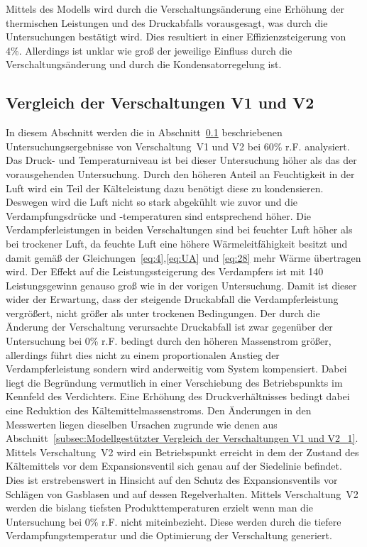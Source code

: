 Mittels des Modells wird durch die Verschaltungsänderung eine Erhöhung der thermischen Leistungen und des Druckabfalls vorausgesagt, was durch die Untersuchungen bestätigt wird. Dies resultiert in einer Effizienzsteigerung von \unit{4}{\%}. Allerdings ist unklar wie groß der jeweilige Einfluss durch die Verschaltungsänderung und durch die Kondensatorregelung ist.

\subsection{Vergleich der Verschaltungen V1 und V2}
\label{subsec:Vergleich der Verschaltungen V1 und V2_1}

In diesem Abschnitt werden die in Abschnitt~\ref{subsec:Vergleich der Verschaltungen V1 und V2_1} beschriebenen Untersuchungsergebnisse von Verschaltung~V1 und V2 bei \unit{60}{\%} r.F. analysiert.
Das Druck- und Temperaturniveau ist bei dieser Untersuchung höher als das der vorausgehenden Untersuchung. Durch den höheren Anteil an Feuchtigkeit in der Luft wird ein Teil der Kälteleistung dazu benötigt diese zu kondensieren. Deswegen wird die Luft nicht so stark abgekühlt wie zuvor und die Verdampfungsdrücke und -temperaturen sind entsprechend höher. Die Verdampferleistungen in beiden Verschaltungen sind bei feuchter Luft höher als bei trockener Luft, da feuchte Luft eine höhere Wärmeleitfähigkeit besitzt und damit gemäß der Gleichungen~\ref{eq:4},\ref{eq:UA} und \ref{eq:28} mehr Wärme übertragen wird\cite{Lasance.2003}. Der Effekt auf die Leistungssteigerung des Verdampfers ist mit \unit{140}{\watt} Leistungsgewinn genauso groß wie in der vorigen Untersuchung. Damit ist dieser wider der Erwartung, dass der steigende Druckabfall die Verdampferleistung vergrößert, nicht größer als unter trockenen Bedingungen. Der durch die Änderung der Verschaltung verursachte Druckabfall ist zwar gegenüber der Untersuchung bei \unit{0}{\%} r.F. bedingt durch den höheren Massenstrom größer, allerdings führt dies nicht zu einem proportionalen Anstieg der Verdampferleistung sondern wird anderweitig vom System kompensiert. Dabei liegt die Begründung vermutlich in einer Verschiebung des Betriebspunkts im Kennfeld des Verdichters. Eine Erhöhung des Druckverhältnisses bedingt dabei eine Reduktion des Kältemittelmassenstroms.
Den Änderungen in den Messwerten liegen dieselben Ursachen zugrunde wie denen aus Abschnitt~\ref{subsec:Modellgestützter Vergleich der Verschaltungen V1 und V2_1}.
Mittels Verschaltung~V2 wird ein Betriebspunkt erreicht in dem der Zustand des Kältemittels vor dem Expansionsventil sich genau auf der Siedelinie befindet. 
Dies ist erstrebenswert in Hinsicht auf den Schutz des Expansionsventils vor Schlägen von Gasblasen und auf dessen Regelverhalten.
Mittels Verschaltung~V2 werden die bislang tiefsten Produkttemperaturen erzielt wenn man die Untersuchung bei \unit{0}{\%} r.F. nicht miteinbezieht. Diese werden durch die tiefere Verdampfungstemperatur und die Optimierung der Verschaltung generiert.

